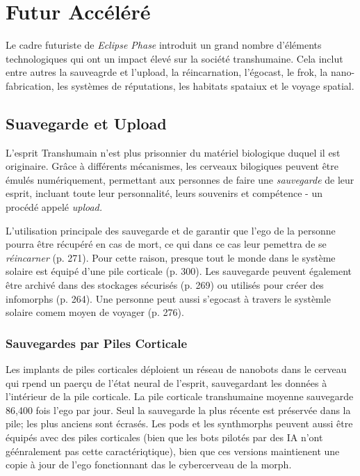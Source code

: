 \chapter{Futur Accéléré} \label{cha:accelerated-future} 

Le cadre futuriste de \textit{Eclipse Phase} introduit un grand nombre d'éléments technologiques qui ont un impact élevé sur la société transhumaine. Cela inclut entre autres la sauveagrde et l'upload, la réincarnation, l'égocast, le frok, la nano-fabrication, les systèmes de réputations, les habitats spataiux et le voyage spatial. 

\section{Suavegarde et Upload} 

L'esprit Transhumain n'est plus prisonnier du matériel biologique duquel il est originaire. Grâce à différents mécanismes, les cerveaux bilogiques peuvent être émulés numériquement, permettant aux personnes de faire une \textit{sauvegarde} de leur esprit, incluant toute leur personnalité, leurs souvenirs et compétence - un procédé appelé \textit{upload.} 

L'utilisation principale des sauvegarde et de garantir que l'ego de la personne pourra être récupéré en cas de mort, ce qui dans ce cas leur pemettra de se \textit{réincarner} (p. 271). Pour cette raison, presque tout le monde dans le système solaire est équipé d'une pile corticale (p. 300). Les sauvegarde peuvent également être archivé dans des stockages sécurisés (p. 269) ou utilisés pour créer des infomorphs (p. 264). Une personne peut aussi s'egocast à travers le systèmle solaire comem moyen de voyager (p. 276). 

\subsection{Sauvegardes par Piles Corticale} 

Les implants de piles corticales déploient un réseau de nanobots dans le cerveau qui rpend un paerçu de l'état neural de l'esprit, sauvegardant les données à l'intérieur de la pile corticale. La pile corticale transhumaine moyenne sauvegarde 86,400 fois l'ego par jour. Seul la sauvegarde la plus récente est préservée dans la pile; les plus anciens sont écrasés. Les pods et les synthmorphs peuvent aussi être équipés avec des piles corticales (bien que les bots pilotés par des IA n'ont géénralement pas cette caractériqtique), bien que ces versions maintienent une copie à jour de l'ego fonctionnant das le cybercerveau de la morph. 

